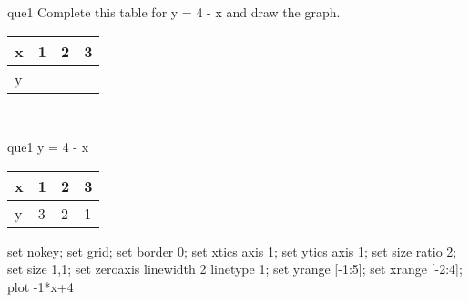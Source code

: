 \documentclass[13.5pt, varwidth=true]{beamer}
\begin{document}
\begin{frame}[shrink=19,fragile]
	\begin{beamercolorbox}[rounded=true, left, shadow=true,wd=14.8cm]{que1}
		 Complete this table for y = 4 - x and draw the graph. \\[0.3cm] \renewcommand{\arraystretch}{1.2}\begin{tabular}{|C|C|C|C|} \hline x & 1 & 2 & 3 \\ \hline y & & & \\ \hline \end{tabular}\\[0.3cm]
	\end{beamercolorbox}
\end{frame}
\begin{frame}[shrink=19,fragile]
	\begin{beamercolorbox}[rounded=true, left, shadow=true,wd=14.8cm]{que1}
		y = 4 - x\renewcommand{\arraystretch}{1.2}\begin{tabular}{|C|C|C|C|} \hline x & 1 & 2 & 3 \\ \hline y & 3 & 2 & 1\\ \hline \end{tabular}\begin{gnuplot}[terminal=pdf] set nokey; set grid; set border 0; set xtics axis 1; set ytics axis 1; set size ratio 2; set size 1,1; set zeroaxis linewidth 2 linetype 1; set yrange [-1:5]; set xrange [-2:4]; plot -1*x+4 \end{gnuplot}
	\end{beamercolorbox}
\end{frame}
\end{document}
